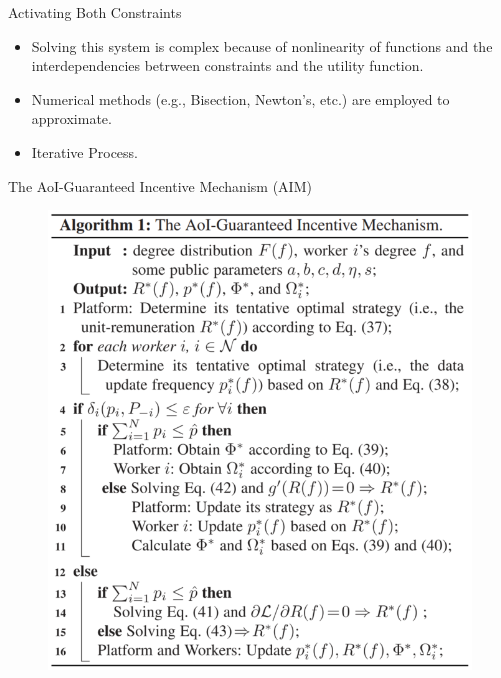 \documentclass[aspectratio=169,xcolor=dvipsnames]{beamer}
\begin{document}
\begin{frame}[fragile]{Activating Both Constraints}
    \footnotesize %
    \hspace{0.5cm}
    \begin{itemize}
        \item Solving this system is complex because of nonlinearity of functions and the interdependencies betrween constraints and the utility function.\\
        
        \item Numerical methods (e.g., Bisection, Newton’s, etc.) are employed to approximate.\\
        
        \item Iterative Process.
         
    \end{itemize}
\end{frame}

\begin{frame}[fragile]{The AoI-Guaranteed Incentive Mechanism (AIM)}
\begin{figure}
    \centering
    \includegraphics[width=0.4\linewidth]{AIM.png}
\end{figure}
\end{frame}
\end{document}
